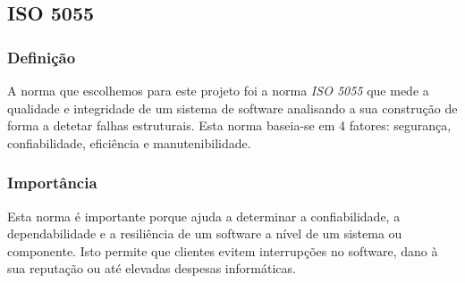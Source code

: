 \documentclass[a4paper,12pt]{article} %
\begin{document}
\subsection{ISO 5055}
\subsubsection{Definição}
A norma que escolhemos para este projeto foi a norma \textit{ISO 5055} que mede a qualidade e integridade de um sistema de software analisando a sua construção de forma a detetar falhas estruturais. Esta norma baseia-se em 4 fatores: segurança, confiabilidade, eficiência e manutenibilidade.

\subsubsection{Importância}
Esta norma é importante porque ajuda a determinar a confiabilidade, a dependabilidade e a resiliência de um software a nível de um sistema ou componente. Isto permite que clientes evitem interrupções no software, dano à sua reputação ou até elevadas despesas informáticas.

\newpage
\end{document}
